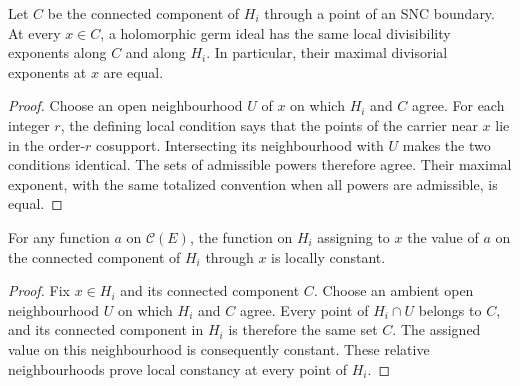 \begin{lemma}
\label{hir:boundary-component-germ-divisibility}
\leanok
Let \(C\) be the connected component of \(H_i\) through a point of an SNC
boundary. At every \(x\in C\), a holomorphic germ ideal has the same local
divisibility exponents along \(C\) and along \(H_i\). In particular, their
maximal divisorial exponents at \(x\) are equal.
\end{lemma}
\begin{proof}
Choose an open neighbourhood \(U\) of \(x\) on which \(H_i\) and \(C\)
agree. For each integer \(r\), the defining local condition says that the
points of the carrier near \(x\) lie in the order-\(r\) cosupport. Intersecting
its neighbourhood with \(U\) makes the two conditions identical. The sets of
admissible powers therefore agree. Their maximal exponent, with the same
totalized convention when all powers are admissible, is equal.
\end{proof}

\begin{lemma}
\label{hir:boundary-component-function-gluing}
\leanok
For any function \(a\) on \(\mathcal C(E)\), the function on \(H_i\) assigning
to \(x\) the value of \(a\) on the connected component of \(H_i\) through
\(x\) is locally constant.
\end{lemma}
\begin{proof}
Fix \(x\in H_i\) and its connected component \(C\). Choose an ambient open
neighbourhood \(U\) on which \(H_i\) and \(C\) agree. Every point of
\(H_i\cap U\) belongs to \(C\), and its connected component in \(H_i\)
is therefore the same set \(C\). The assigned value on this neighbourhood
is consequently constant. These relative neighbourhoods prove local
constancy at every point of \(H_i\).
\end{proof}

